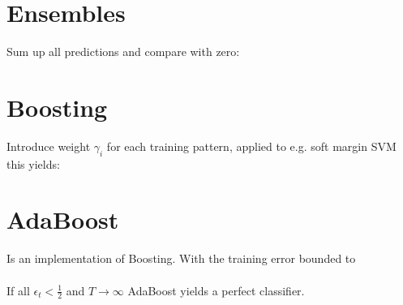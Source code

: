 \documentclass[a4paper,12pt,pdftex]{scrreprt}
\begin{document}
	\section{Ensembles} %
	\label{sec:ensembles}
	Sum up all predictions and compare with zero:\\

	\section{Boosting} %
	\label{sec:boosting}
	Introduce weight $\gamma_{i}$ for each training pattern, applied to e.g. soft margin SVM this yields:\\

	\section{AdaBoost} %
	\label{sec:adaboost}
	Is an implementation of Boosting. With the training error bounded to\\
	\\
	If all $\epsilon_{t} < \frac{1}{2}$ and $T \to \infty$ AdaBoost yields a perfect classifier.

\end{document}
